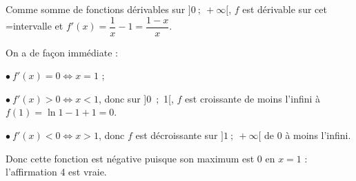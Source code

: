 \begin{enumerate}
Comme somme de fonctions dérivables sur $]0~;~+ \infty[$, $f$ est dérivable sur cet =intervalle et $f'(x) = \dfrac 1x - 1 = \dfrac{1 - x}{x}$.

On a de façon immédiate :

$\bullet~$$f'(x) = 0 \iff x = 1$ ;

$\bullet~$$f'(x) > 0 \iff x < 1$, donc sur ]0~;~1[, \: $f$ est croissante de moins l'infini à $f(1) = \ln 1 - 1 + 1 = 0$.

$\bullet~f'(x) < 0 \iff x > 1$, donc $f$ est décroissante sur $]1~;~+ \infty[$ de 0 à moins l'infini.

Donc cette fonction est négative puisque son maximum est 0 en $x = 1$ : l'affirmation 4 est vraie.
\end{enumerate}

\medskip
